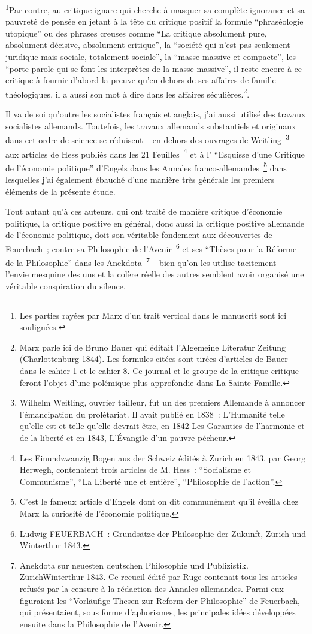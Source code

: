 \documentclass[french,twoside]{book} %
\begin{document}
\footnote{Les parties rayées par Marx d’un trait vertical dans le manuscrit sont ici soulignées.}Par contre, au critique ignare qui cherche à masquer sa complète ignorance et sa pauvreté de pensée en jetant à la tête du critique positif la formule “phraséologie utopique” ou des phrases creuses comme “La critique absolument pure, absolument décisive, absolument critique”, la “société qui n’est pas seulement juridique mais sociale, totalement sociale”, la “masse massive et compacte”, les “porte-parole qui se font les interprètes de la masse massive”, il reste encore à ce critique à fournir d’abord la preuve qu’en dehors de ses affaires de famille théologiques, il a aussi son mot à dire dans les affaires séculières.\footnote{Marx parle ici de Bruno Bauer qui éditait l’Algemeine Literatur Zeitung (Charlottenburg 1844). Les formules citées sont tirées d’articles de Bauer dans le cahier 1 et le cahier 8. Ce journal et le groupe de la critique critique feront l’objet d’une polémique plus approfondie dans La Sainte Famille.}.\par
Il va de soi qu’outre les socialistes français et anglais, j’ai aussi utilisé des travaux socialistes allemands. Toutefois, les travaux allemands substantiels et originaux dans cet ordre de science se réduisent – en dehors des ouvrages de Weitling \footnote{Wilhelm Weitling, ouvrier tailleur, fut un des premiers Allemande à annoncer l’émancipation du prolétariat. Il avait publié en 1838 : L’Humanité telle qu’elle est et telle qu’elle devrait être, en 1842 Les Garanties de l’harmonie et de la liberté et en 1843, L’Évangile d’un pauvre pécheur.} – aux articles de Hess publiés dans les 21 Feuilles \footnote{Les Einundzwanzig Bogen aus der Schweiz édités à Zurich en 1843, par Georg Herwegh, contenaient trois articles de M. Hess : “Socialisme et Communisme”, “La Liberté une et entière”, “Philosophie de l’action”.} et à l’ “Esquisse d’une Critique de l’économie politique” d’Engels dans les Annales franco-allemandes \footnote{C’est le fameux article d’Engels dont on dit communément qu’il éveilla chez Marx la curiosité de l’économie politique.} dans lesquelles j’ai également ébauché d’une manière très générale les premiers éléments de la présente étude.\par
Tout autant qu’à ces auteurs, qui ont traité de manière critique d’économie politique, la critique positive en général, donc aussi la critique positive allemande de l’économie politique, doit son véritable fondement aux découvertes de Feuerbach ; contre sa Philosophie de l’Avenir \footnote{Ludwig FEUERBACH : Grundsätze der Philosophie der Zukunft, Zürich und Winterthur 1843.} et ses “Thèses pour la Réforme de la Philosophie” dans les Anekdota \footnote{Anekdota sur neuesten deutschen Philosophie und Publizistik. ZürichWinterthur 1843. Ce recueil édité par Ruge contenait tous les articles refusés par la censure à la rédaction des Annales allemandes. Parmi eux figuraient les “Vorläufige Thesen zur Reform der Philosophie” de Feuerbach, qui présentaient, sous forme d’aphorismes, les principales idées développées ensuite dans la Philosophie de l’Avenir.} – bien qu’on les utilise tacitement – l’envie mesquine des uns et la colère réelle des autres semblent avoir organisé une véritable conspiration du silence.\par
\end{document}
